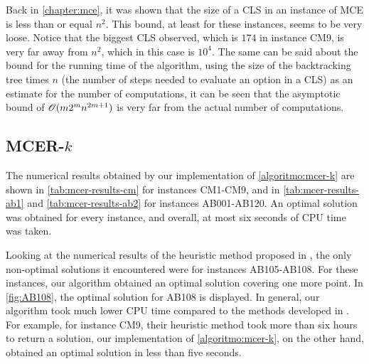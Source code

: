Back in \autoref{chapter:mce}, it was shown that the size of a CLS in an instance of MCE is less than or equal $n^2$. This bound, at least for these instances, seems to be very loose. Notice that the biggest CLS observed, which is $174$ in instance CM9, is very far away from $n^2$, which in this case is $10^4$.
The same can be said about the bound for the running time of the algorithm, using the size of the backtracking tree times $n$ (the number of steps needed to evaluate an option in a CLS) as an estimate for the number of computations, it can be seen that the asymptotic bound of $\mathscr{O}(m2^mn^{2m+1})$ is very far from the actual number of computations.

\subsection{MCER-$k$}

The numerical results obtained by our implementation of \autoref{algoritmo:mcer-k} are shown in \autoref{tab:mcer-results-cm} for instances CM1-CM9, and in \autoref{tab:mcer-results-ab1} and \autoref{tab:mcer-results-ab2} for instances AB001-AB120. 
An optimal solution was obtained for every instance, and overall, at most six seconds of CPU time was taken.

Looking at the numerical results of the heuristic method proposed in , the only non-optimal solutions it encountered were for instances AB105-AB108. For these instances, our algorithm obtained an optimal solution covering one more point. In \autoref{fig:AB108}, the optimal solution for AB108 is displayed.
In general, our algorithm took much lower CPU time compared to the methods developed in . For example, for instance CM9, their heuristic method took more than six hours to return a solution, our implementation of \autoref{algoritmo:mcer-k}, on the other hand, obtained an optimal solution in less than five seconds.

